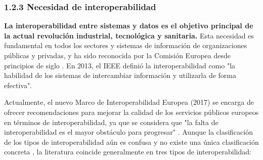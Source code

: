 \begin{itemize}
\end{itemize}

\subsubsection{1.2.3 Necesidad de interoperabilidad}


\textbf{La interoperabilidad entre sistemas y datos es el objetivo principal de la actual revolución industrial, tecnológica y sanitaria.} Esta necesidad es fundamental en todos los sectores y sistemas de información de organizaciones públicas y privadas, y ha sido reconocida por la Comisión Europea desde principios de siglo \parencite{CEU1999ida}. En 2013, el IEEE definió la interoperabilidad como "la habilidad de los sistemas de intercambiar información y utilizarla de forma efectiva". 

Actualmente, el nuevo Marco de Interoperabilidad Europea (2017) se encarga de ofrecer recomendaciones para mejorar la calidad de los servicios públicos europeos en términos de interoperabilidad, ya que se considera que "la falta de interoperabilidad es el mayor obstáculo para progresar" \parencite{kouroubali2019new}. Aunque la clasificación de los tipos de interoperabilidad aún es confusa y no existe una única clasificación concreta \parencite{santos2021interoperability}, la literatura coincide generalmente en tres tipos de interoperabilidad:

